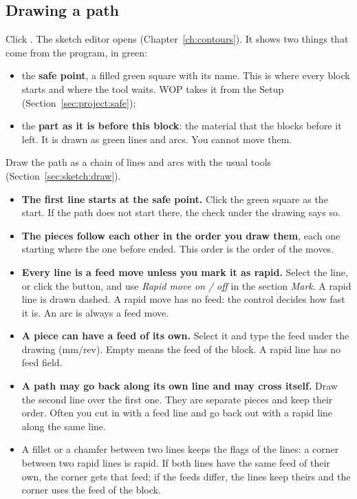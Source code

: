 \subsection{Drawing a path}
Click . The sketch editor opens (Chapter~\ref{ch:contours}). It shows two things that come from the program, in green:

\begin{itemize}
\item the \textbf{safe point}, a filled green square with its name. This is where every block starts and where the tool waits. WOP takes it from the Setup (Section~\ref{sec:project:safe});
\item the \textbf{part as it is before this block}: the material that the blocks before it left. It is drawn as green lines and arcs. You cannot move them.
\end{itemize}


Draw the path as a chain of lines and arcs with the usual tools (Section~\ref{sec:sketch:draw}).

\begin{itemize}
\item \textbf{The first line starts at the safe point.} Click the green square as the start. If the path does not start there, the check under the drawing says so.
\item \textbf{The pieces follow each other in the order you draw them}, each one starting where the one before ended. This order is the order of the moves.
\item \textbf{Every line is a feed move unless you mark it as rapid.} Select the line, or click the button, and use \emph{Rapid move on / off} in the section \emph{Mark}. A rapid line is drawn dashed. A rapid move has no feed: the control decides how fast it is. An arc is always a feed move.
\item \textbf{A piece can have a feed of its own.} Select it and type the feed under the drawing (mm/rev). Empty means the feed of the block. A rapid line has no feed field.
\item \textbf{A path may go back along its own line and may cross itself.} Draw the second line over the first one. They are separate pieces and keep their order. Often you cut in with a feed line and go back out with a rapid line along the same line.
\item A fillet or a chamfer between two lines keeps the flags of the lines: a corner between two rapid lines is rapid. If both lines have the same feed of their own, the corner gets that feed; if the feeds differ, the lines keep theirs and the corner uses the feed of the block.
\end{itemize}

